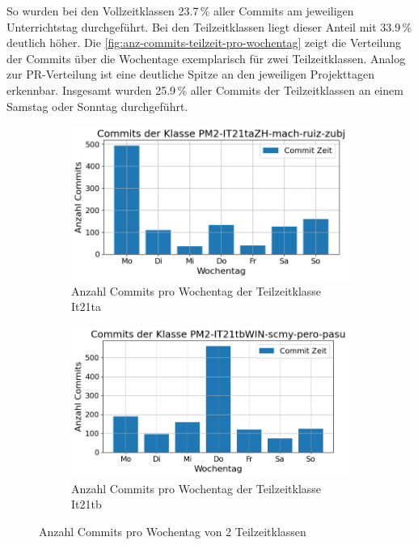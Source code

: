 So wurden bei den Vollzeitklassen 23.7\,\% aller Commits am jeweiligen Unterrichtstag durchgeführt. Bei den Teilzeitklassen liegt dieser Anteil mit 33.9\,\% deutlich höher. Die \autoref{fig:anz-commits-teilzeit-pro-wochentag} zeigt die Verteilung der Commits über die Wochentage exemplarisch für zwei Teilzeitklassen. Analog zur PR-Verteilung ist eine deutliche Spitze an den jeweiligen Projekttagen erkennbar. Insgesamt wurden 25.9\,\% aller Commits der Teilzeitklassen an einem Samstag oder Sonntag durchgeführt.

\begin{figure}[htbp]
    \centering
    \begin{subfigure}[b]{0.48\textwidth}
        \centering
        \includegraphics[width=\textwidth]{Figures/commits-klasse-per-wochentag-21ta.png}
         \caption{Anzahl Commits pro Wochentag der Teilzeitklasse It21ta}
        \label{fig:anzahl-commits-pro-wochentag-it21ta}
    \end{subfigure}
    \hfill
    \begin{subfigure}[b]{0.48\textwidth}
        \centering
        \includegraphics[width=\textwidth]{Figures/commits-klasse-per-wochentag-21tb.png}
         \caption{Anzahl Commits pro Wochentag der Teilzeitklasse It21tb}
        \label{fig:anzahl-commits-pro-wochentag-it21tb}
    \end{subfigure}
    \caption{Anzahl Commits pro Wochentag von 2 Teilzeitklassen}
    \label{fig:anz-commits-teilzeit-pro-wochentag}
\end{figure}

